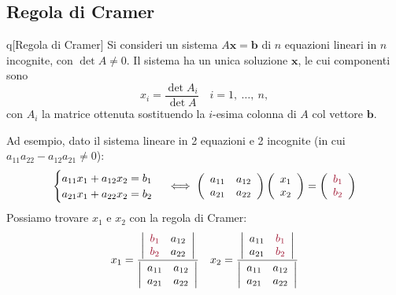 \subsection{Regola di Cramer}\label{Cramerrimembriancor}
\begin{theorem}{q}[Regola di Cramer]
	Si consideri un sistema $A\mathbf{x}=\mathbf{b}$ di $n$ equazioni lineari in $n$ incognite, con $\det A \neq 0$. Il sistema ha un unica soluzione $\mathbf{x}$, le cui componenti sono
	\begin{equation*}
		x_i=\frac{\det A_i}{\det A}\quad i=1,\ \ldots,\ n,
	\end{equation*}
	con $A_i$ la matrice ottenuta sostituendo la $i$-esima colonna di $A$ col vettore $\mathbf{b}$.\qedhere
\end{theorem}
Ad esempio, dato il sistema lineare in 2 equazioni e 2 incognite (in cui $a_{11}a_{22}-a_{12}a_{21}\neq 0$):
\begin{equation*}
	\begin{cases}
		a_{11}x_1+a_{12}x_2=b_1\\
		a_{21}x_1+a_{22}x_2=b_2
	\end{cases}\iff
\left(\begin{array}{cc}
	a_{11} & a_{12} \\
	a_{21} & a_{22}
\end{array}\right)\left(\begin{array}{c}
x_1 \\
x_2
\end{array}\right)=\left(\begin{array}{c}
\textcolor{reddo}{b_1} \\
\textcolor{reddo}{b_2}
\end{array}\right)
\end{equation*}
Possiamo trovare $x_1$ e $x_2$ con la regola di Cramer:
\begin{equation*}
	x_1=\frac{\left|\begin{array}{cc}
			\textcolor{reddo}{b_1} & a_{12} \\
			\textcolor{reddo}{b_2} & a_{22}
		\end{array}\right|}{\left|\begin{array}{cc}
		a_{11} & a_{12} \\
		a_{21} & a_{22}
	\end{array}\right|}\quad x_2=\frac{\left|\begin{array}{cc}
	 a_{11} & \textcolor{reddo}{b_1} \\
	 a_{21} & \textcolor{reddo}{b_2}
\end{array}\right|}{\left|\begin{array}{cc}
a_{11} & a_{12} \\
a_{21} & a_{22}
\end{array}\right|}
\end{equation*}
